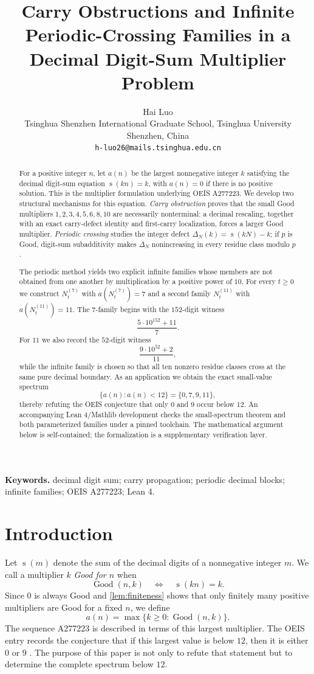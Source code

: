 \documentclass[11pt]{article}
\title{Carry Obstructions and Infinite Periodic-Crossing Families in a Decimal Digit-Sum Multiplier Problem}
\author{Hai Luo\\[6pt]
  \normalsize Tsinghua Shenzhen International Graduate School, Tsinghua University\\
  \normalsize Shenzhen, China\\[2pt]
  \normalsize\texttt{h-luo26@mails.tsinghua.edu.cn}}
\date{}
\newcommand{\ds}{\operatorname{s}}
\newcommand{\Good}{\operatorname{Good}}
\newcommand{\Def}{\Delta}
\begin{document}
\maketitle

\begin{abstract}
For a positive integer $n$, let $a(n)$ be the largest nonnegative integer $k$ satisfying the decimal digit-sum equation $\ds(kn)=k$, with $a(n)=0$ if there is no positive solution.  This is the multiplier formulation underlying OEIS A277223.  We develop two structural mechanisms for this equation.  \emph{Carry obstruction} proves that the small Good multipliers $1,2,3,4,5,6,8,10$ are necessarily nonterminal: a decimal rescaling, together with an exact carry-defect identity and first-carry localization, forces a larger Good multiplier.  \emph{Periodic crossing} studies the integer defect $\Def_N(k)=\ds(kN)-k$; if $p$ is Good, digit-sum subadditivity makes $\Def_N$ nonincreasing in every residue class modulo $p$.

The periodic method yields two explicit infinite families whose members are not obtained from one another by multiplication by a positive power of $10$.  For every $t\ge0$ we construct $N^{(7)}_t$ with $a(N^{(7)}_t)=7$ and a second family $N^{(11)}_t$ with $a(N^{(11)}_t)=11$.  The $7$-family begins with the $152$-digit witness
\[
 \frac{5\cdot10^{152}+11}{7}.
\]
For $11$ we also record the $52$-digit witness
\[
 \frac{9\cdot10^{52}+2}{11},
\]
while the infinite family is chosen so that all ten nonzero residue classes cross at the same pure decimal boundary.  As an application we obtain the exact small-value spectrum
\[
  \{a(n):a(n)<12\}=\{0,7,9,11\},
\]
thereby refuting the OEIS conjecture that only $0$ and $9$ occur below $12$.  An accompanying Lean 4/Mathlib development checks the small-spectrum theorem and both parameterized families under a pinned toolchain.  The mathematical argument below is self-contained; the formalization is a supplementary verification layer.
\end{abstract}

\noindent\textbf{Keywords.} decimal digit sum; carry propagation; periodic decimal blocks; infinite families; OEIS A277223; Lean 4.

\section{Introduction}
Let $\ds(m)$ denote the sum of the decimal digits of a nonnegative integer $m$.  We call a multiplier $k$ \emph{Good for $n$} when
\begin{equation}\label{eq:good}
  \Good(n,k)\quad\Longleftrightarrow\quad \ds(kn)=k.
\end{equation}
Since $0$ is always Good and \cref{lem:finiteness} shows that only finitely many positive multipliers are Good for a fixed $n$, we define
\[
  a(n)=\max\{k\ge0:\Good(n,k)\}.
\]
The sequence A277223 is described in terms of this largest multiplier.  The OEIS entry records the conjecture that if this largest value is below $12$, then it is either $0$ or $9$ \cite{oeisA277223}.  The purpose of this paper is not only to refute that statement but to determine the complete spectrum below $12$.
\end{document}
